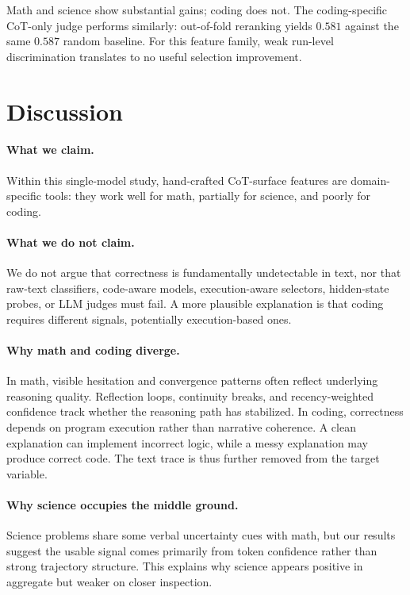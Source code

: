 \documentclass[10pt,twocolumn]{article}
\begin{document}
Math and science show substantial gains; coding does not. The coding-specific CoT-only judge performs similarly: out-of-fold reranking yields $0.581$ against the same $0.587$ random baseline. For this feature family, weak run-level discrimination translates to no useful selection improvement.

\section{Discussion}
\label{sec:why}

\paragraph{What we claim.}
Within this single-model study, hand-crafted CoT-surface features are domain-specific tools: they work well for math, partially for science, and poorly for coding.

\paragraph{What we do not claim.}
We do not argue that correctness is fundamentally undetectable in text, nor that raw-text classifiers, code-aware models, execution-aware selectors, hidden-state probes, or LLM judges must fail. A more plausible explanation is that coding requires different signals, potentially execution-based ones.

\paragraph{Why math and coding diverge.}
In math, visible hesitation and convergence patterns often reflect underlying reasoning quality. Reflection loops, continuity breaks, and recency-weighted confidence track whether the reasoning path has stabilized. In coding, correctness depends on program execution rather than narrative coherence. A clean explanation can implement incorrect logic, while a messy explanation may produce correct code. The text trace is thus further removed from the target variable.

\paragraph{Why science occupies the middle ground.}
Science problems share some verbal uncertainty cues with math, but our results suggest the usable signal comes primarily from token confidence rather than strong trajectory structure. This explains why science appears positive in aggregate but weaker on closer inspection.
\end{document}
